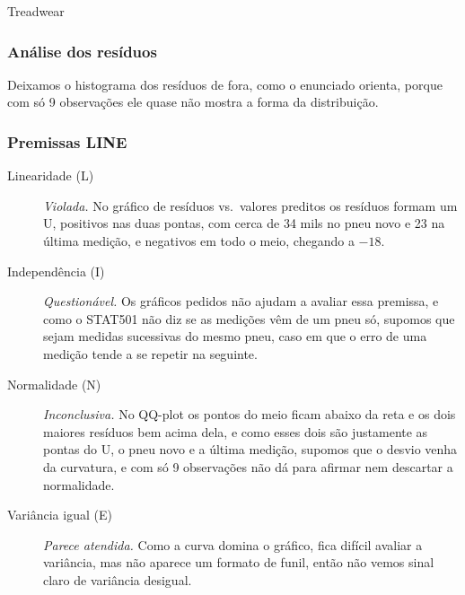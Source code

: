 \begin{dataset}{Treadwear}

\subsubsection{Análise dos resíduos}

Deixamos o histograma dos resíduos de fora, como o enunciado orienta, porque com só 9 observações ele quase não mostra a forma da distribuição.



\subsubsection{Premissas LINE}

\begin{description}
    \item[Linearidade (L)] \textit{Violada.} No gráfico de resíduos vs.\ valores preditos os resíduos formam um U, positivos nas duas pontas, com cerca de 34 mils no pneu novo e 23 na última medição, e negativos em todo o meio, chegando a $-18$.
    \item[Independência (I)] \textit{Questionável.} Os gráficos pedidos não ajudam a avaliar essa premissa, e como o STAT501 não diz se as medições vêm de um pneu só, supomos que sejam medidas sucessivas do mesmo pneu, caso em que o erro de uma medição tende a se repetir na seguinte.
    \item[Normalidade (N)] \textit{Inconclusiva.} No QQ-plot os pontos do meio ficam abaixo da reta e os dois maiores resíduos bem acima dela, e como esses dois são justamente as pontas do U, o pneu novo e a última medição, supomos que o desvio venha da curvatura, e com só 9 observações não dá para afirmar nem descartar a normalidade.
    \item[Variância igual (E)] \textit{Parece atendida.} Como a curva domina o gráfico, fica difícil avaliar a variância, mas não aparece um formato de funil, então não vemos sinal claro de variância desigual.
\end{description}


\end{dataset}
